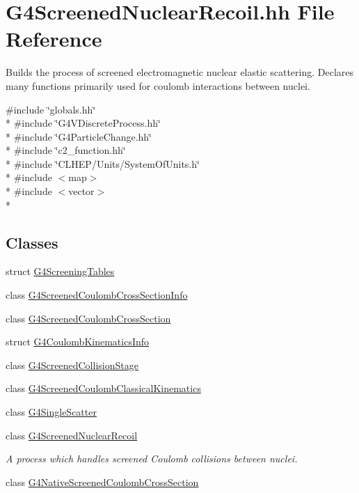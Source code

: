 \hypertarget{G4ScreenedNuclearRecoil_8hh}{\section{G4\-Screened\-Nuclear\-Recoil.\-hh File Reference}
\label{G4ScreenedNuclearRecoil_8hh}
}


Builds the process of screened electromagnetic nuclear elastic scattering. Declares many functions primarily used for coulomb interactions between nuclei.  


{\ttfamily \#include \char`\"{}globals.\-hh\char`\"{}}\\*
{\ttfamily \#include \char`\"{}G4\-V\-Discrete\-Process.\-hh\char`\"{}}\\*
{\ttfamily \#include \char`\"{}G4\-Particle\-Change.\-hh\char`\"{}}\\*
{\ttfamily \#include \char`\"{}c2\-\_\-function.\-hh\char`\"{}}\\*
{\ttfamily \#include \char`\"{}C\-L\-H\-E\-P/\-Units/\-System\-Of\-Units.\-h\char`\"{}}\\*
{\ttfamily \#include $<$map$>$}\\*
{\ttfamily \#include $<$vector$>$}\\*
\subsection*{Classes}
\begin{DoxyCompactItemize}
\item 
struct \hyperlink{structG4ScreeningTables}{G4\-Screening\-Tables}
\item 
class \hyperlink{classG4ScreenedCoulombCrossSectionInfo}{G4\-Screened\-Coulomb\-Cross\-Section\-Info}
\item 
class \hyperlink{classG4ScreenedCoulombCrossSection}{G4\-Screened\-Coulomb\-Cross\-Section}
\item 
struct \hyperlink{structG4CoulombKinematicsInfo}{G4\-Coulomb\-Kinematics\-Info}
\item 
class \hyperlink{classG4ScreenedCollisionStage}{G4\-Screened\-Collision\-Stage}
\item 
class \hyperlink{classG4ScreenedCoulombClassicalKinematics}{G4\-Screened\-Coulomb\-Classical\-Kinematics}
\item 
class \hyperlink{classG4SingleScatter}{G4\-Single\-Scatter}
\item 
class \hyperlink{classG4ScreenedNuclearRecoil}{G4\-Screened\-Nuclear\-Recoil}
\begin{DoxyCompactList}\small\item\em A process which handles screened Coulomb collisions between nuclei. \end{DoxyCompactList}\item 
class \hyperlink{classG4NativeScreenedCoulombCrossSection}{G4\-Native\-Screened\-Coulomb\-Cross\-Section}
\end{DoxyCompactItemize}
